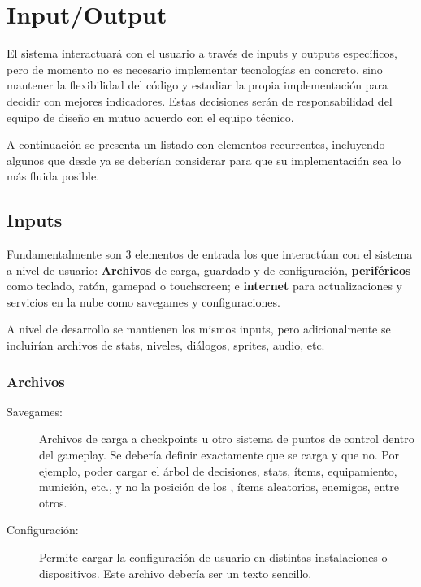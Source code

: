 
\section{Input/Output}\label{io:input-output}

El sistema interactuará con el usuario a través de inputs y outputs específicos, pero de momento no es necesario implementar tecnologías en concreto, sino mantener la flexibilidad del código y estudiar la propia implementación para decidir con mejores indicadores. Estas decisiones serán de responsabilidad del equipo de diseño en mutuo acuerdo con el equipo técnico.

A continuación se presenta un listado con elementos recurrentes, incluyendo algunos que desde ya se deberían considerar para que su implementación sea lo más fluida posible.

\subsection{Inputs}
Fundamentalmente son 3 elementos de entrada los que interactúan con el sistema a nivel de usuario: \textbf{Archivos} de carga, guardado y de configuración, \textbf{periféricos} como teclado, ratón, gamepad o touchscreen; e \textbf{internet} para actualizaciones y servicios en la nube como savegames y configuraciones.

A nivel de desarrollo se mantienen los mismos inputs, pero adicionalmente se incluirían archivos de stats, niveles, diálogos, sprites, audio, etc.

\subsubsection{Archivos}

\begin{description}
\item[Savegames:] Archivos de carga a checkpoints u otro sistema de puntos de control dentro del gameplay. Se debería definir exactamente que se carga y que no. Por ejemplo, poder cargar el árbol de decisiones, stats, ítems, equipamiento, munición, etc., y no la posición de los , ítems aleatorios, enemigos, entre otros.

\item[Configuración:] Permite cargar la configuración de usuario en distintas instalaciones o dispositivos. Este archivo debería ser un texto sencillo.
\end{description}

